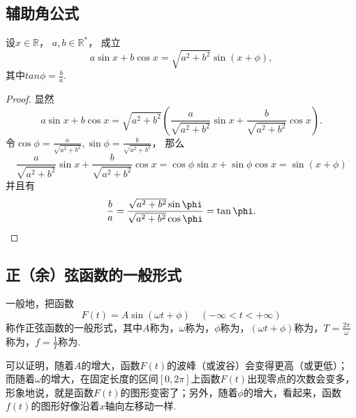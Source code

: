 \subsection{辅助角公式}
\begin{proposition}[辅助角公式]
设\(x\in\mathbb{R}\)，
\(a,b\in\mathbb{R}^*\)，
成立\begin{equation}
	a \sin x + b \cos x = \sqrt{a^2 + b^2} \sin(x + \phi),
\end{equation}
其中\(tan\phi = \frac{b}{a}\).
\begin{proof}
显然\begin{equation*}
	a \sin x + b \cos x
	= \sqrt{a^2 + b^2} \left(
		\frac{a}{\sqrt{a^2 + b^2}} \sin x
		+ \frac{b}{\sqrt{a^2 + b^2}} \cos x
	\right).
\end{equation*}
令\(\cos\phi = \frac{a}{\sqrt{a^2 + b^2}},
\sin\phi = \frac{b}{\sqrt{a^2 + b^2}}\)，
那么\begin{equation*}
	\frac{a}{\sqrt{a^2 + b^2}} \sin x
	+ \frac{b}{\sqrt{a^2 + b^2}} \cos x
	= \cos\phi \sin x + \sin\phi \cos x
	= \sin(x + \phi)
\end{equation*}
并且有\begin{equation*}
	\frac{b}{a}
	= \frac{\sqrt{a^2 + b^2} \sin\phi}{\sqrt{a^2 + b^2} \cos\phi}
	= \tan\phi.
	\qedhere
\end{equation*}
\end{proof}
\end{proposition}

\subsection{正（余）弦函数的一般形式}
\begin{definition}
一般地，把函数\begin{equation*}
F(t) = A \sin(\omega t + \phi) \quad (-\infty<t<+\infty)
\end{equation*}称作正弦函数的一般形式，其中\(A\)称为，\(\omega\)称为，\(\phi\)称为，\((\omega t + \phi)\)称为，\(T = \frac{2\pi}{\omega}\)称为，\(f = \frac{1}{T}\)称为.
\end{definition}
可以证明，随着\(A\)的增大，函数\(F(t)\)的波峰（或波谷）会变得更高（或更低）；而随着\(\omega\)的增大，在固定长度的区间\([0,2\pi]\)上函数\(F(t)\)出现零点的次数会变多，形象地说，就是函数\(F(t)\)的图形变密了；另外，随着\(\phi\)的增大，看起来，函数\(f(t)\)的图形好像沿着\(x\)轴向左移动一样.

